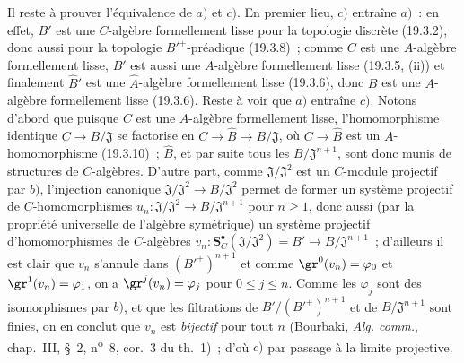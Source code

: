 \begin{env}[19.5.4.4]
\label{0.19.5.4.4-fr}
Il reste à prouver l'équivalence de $a)$ et $c)$. En premier lieu, $c)$ entraîne
$a)$~: en effet, $B'$ est une $C$-algèbre formellement lisse pour la topologie
discrète (19.3.2), donc aussi pour la topologie ${B'}^+$-préadique (19.3.8)~;
comme $C$ est une $A$-algèbre formellement lisse, $B'$ est aussi une
$A$-algèbre formellement lisse (19.3.5, (ii)) et finalement $\widehat{B}'$ est
une $\widehat A$-algèbre formellement lisse (19.3.6), donc $B$ est une
$A$-algèbre formellement lisse (19.3.6). Reste à voir que $a)$ entraîne $c)$.
Notons d'abord que puisque $C$ est une $A$-algèbre formellement lisse,
l'homomorphisme identique $C\to B/\mathfrak J$ se factorise en
$C\to\widehat B\to B/\mathfrak J$, où $C\to\widehat B$ est un
$A$-homomorphisme (19.3.10)~; $\widehat B$, et par suite tous les
$B/\mathfrak J^{n+1}$, sont donc munis de structures de $C$-algèbres. D'autre
part, comme $\mathfrak J/\mathfrak J^2$ est un $C$-module projectif par $b)$,
l'injection canonique $\mathfrak J/\mathfrak J^2\to B/\mathfrak J^2$ permet de
former un système projectif de $C$-homomorphismes
$u_n:\mathfrak J/\mathfrak J^2\to B/\mathfrak J^{n+1}$ pour $n\geq1$, donc
aussi (par la propriété universelle de l'algèbre symétrique) un système
projectif d'homomorphismes de $C$-algèbres
$v_n:\mathbf S_C^\bullet(\mathfrak J/\mathfrak J^2)=B'\to B/\mathfrak J^{n+1}$~;
d'ailleurs il est clair que $v_n$ s'annule dans $({B'}^+)^{n+1}$ et comme
$\gr^0(v_n)=\varphi_0$ et $\gr^1(v_n)=\varphi_1$, on a
$\gr^j(v_n)=\varphi_j$ pour $0\leq j\leq n$. Comme les $\varphi_j$ sont des
isomorphismes par $b)$, et que les filtrations de
$B'/({B'}^+)^{n+1}$ et de $B/\mathfrak J^{n+1}$ sont finies, on en conclut que
$v_n$ est \emph{bijectif} pour
tout $n$ (Bourbaki, \emph{Alg. comm.}, chap.~III, §~2,
n\textsuperscript{o}~8, cor.~3 du th.~1)~; d'où $c)$ par passage à la limite
projective.
\end{env}

